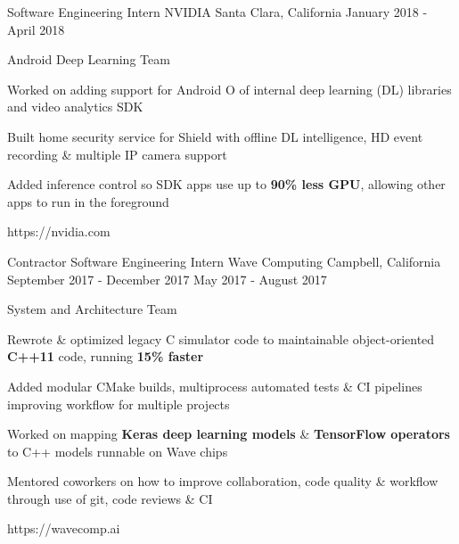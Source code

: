 


\begin{cventries}


\cventrylink
{Software Engineering Intern}
{NVIDIA}
{Santa Clara, California}
{January 2018 - April 2018}
{ %
Android Deep Learning Team
\begin{cvitems}
\item[]
\item{Worked on adding support for Android O of internal deep learning (DL) libraries and video analytics SDK}
\item{Built home security service for Shield with offline DL intelligence, HD event recording \& multiple IP camera support}
\item{Added inference control so SDK apps use up to \textbf{90\% less GPU}, allowing other apps to run in the foreground}
\end{cvitems}
}
{https://nvidia.com}


\cventrylink
{Contractor \newline {\vspace{-.75mm}}
Software Engineering Intern}
{Wave Computing}
{Campbell, California}
{September 2017 - December 2017 \newline {\vspace{-1mm}}
May 2017 - August 2017}
{ %
System and Architecture Team
\begin{cvitems}
\item[]
\item {Rewrote \& optimized legacy C simulator code to maintainable object-oriented \textbf{C++11} code, running \textbf{15\% faster}}
\item {Added modular CMake builds, multiprocess automated tests \& CI pipelines improving workflow for multiple projects}
\item {Worked on mapping \textbf{Keras deep learning models} \& \textbf{TensorFlow operators} to C++ models runnable on Wave chips}
\item {Mentored coworkers on how to improve collaboration, code quality \& workflow through use of git, code reviews \& CI}
\end{cvitems}
}
{https://wavecomp.ai}


\end{cventries}
